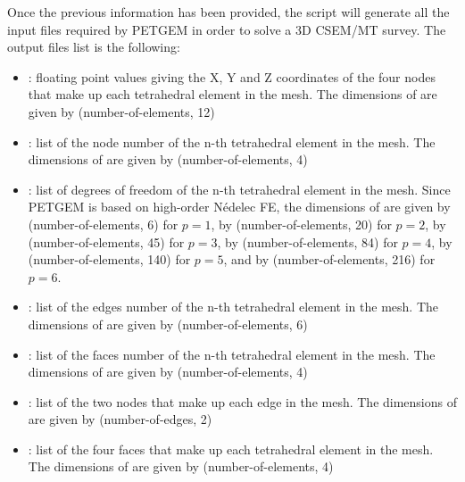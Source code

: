 \documentclass[letterpaper,10pt,english]{sphinxmanual}
\begin{document}
Once the previous information has been provided, the 
script will generate all the input files required by PETGEM in order to
solve a 3D CSEM/MT survey. The  output files list is the
following:
\begin{itemize}
\item {} 
: floating point values giving the X, Y and Z coordinates of the four nodes that make up each tetrahedral element in the mesh. The dimensions of  are given by (number-of-elements, 12)

\item {} 
: list of the node number of the n-th tetrahedral element in the mesh. The dimensions of  are given by (number-of-elements, 4)

\item {} 
: list of degrees of freedom of the n-th tetrahedral element in the mesh. Since PETGEM is based on high-order Nédelec FE, the dimensions of  are given by (number-of-elements, 6) for \(p=1\), by (number-of-elements, 20) for \(p=2\), by (number-of-elements, 45) for \(p=3\), by (number-of-elements, 84) for \(p=4\), by (number-of-elements, 140) for \(p=5\), and by (number-of-elements, 216) for \(p=6\).

\item {} 
: list of the edges number of the n-th tetrahedral element in the mesh. The dimensions of  are given by (number-of-elements, 6)

\item {} 
: list of the faces number of the n-th tetrahedral element in the mesh. The dimensions of  are given by (number-of-elements, 4)

\item {} 
: list of the two nodes that make up each edge in the mesh. The dimensions of  are given by (number-of-edges, 2)

\item {} 
: list of the four faces that make up each tetrahedral element in the mesh. The dimensions of  are given by (number-of-elements, 4)


\end{itemize}
\end{document}
